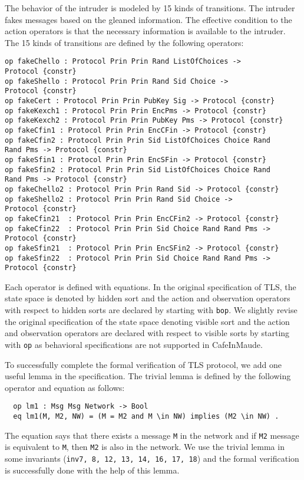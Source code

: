 \documentclass[a4paper,fleqn]{cas-dc}
\begin{document}
The behavior of the intruder is modeled by 15
kinds of transitions. The intruder fakes messages based on the gleaned information. The effective condition to the action operators is that the necessary information is available to the intruder. The 15 kinds of transitions are defined by the following operators:
\begin{small}
\begin{verbatim}
op fakeChello : Protocol Prin Prin Rand ListOfChoices ->
Protocol {constr}
op fakeShello : Protocol Prin Prin Rand Sid Choice ->
Protocol {constr}
op fakeCert : Protocol Prin Prin PubKey Sig -> Protocol {constr}
op fakeKexch1 : Protocol Prin Prin EncPms -> Protocol {constr}
op fakeKexch2 : Protocol Prin Prin PubKey Pms -> Protocol {constr}
op fakeCfin1 : Protocol Prin Prin EncCFin -> Protocol {constr}
op fakeCfin2 : Protocol Prin Prin Sid ListOfChoices Choice Rand 
Rand Pms -> Protocol {constr}
op fakeSfin1 : Protocol Prin Prin EncSFin -> Protocol {constr}
op fakeSfin2 : Protocol Prin Prin Sid ListOfChoices Choice Rand 
Rand Pms -> Protocol {constr}
op fakeChello2 : Protocol Prin Prin Rand Sid -> Protocol {constr}
op fakeShello2 : Protocol Prin Prin Rand Sid Choice ->
Protocol {constr}
op fakeCfin21  : Protocol Prin Prin EncCFin2 -> Protocol {constr}
op fakeCfin22  : Protocol Prin Prin Sid Choice Rand Rand Pms -> 
Protocol {constr}
op fakeSfin21  : Protocol Prin Prin EncSFin2 -> Protocol {constr}
op fakeSfin22  : Protocol Prin Prin Sid Choice Rand Rand Pms -> 
Protocol {constr} 
\end{verbatim}
\end{small}	
Each operator is defined with equations. In the original specification of TLS, the state space is denoted by hidden sort and the action and observation operators with respect to hidden sorts are declared by starting with \verb !bop!. 
We slightly revise the original specification of the state space denoting visible sort and the action and observation operators are declared with respect to visible sorts by starting with \verb !op! as behavioral specifications are not supported in CafeInMaude.

To successfully complete the formal verification of TLS protocol, we add one useful lemma in the specification. The trivial lemma is defined by the following operator and equation as follows:
\begin{small}
\begin{verbatim}
  op lm1 : Msg Msg Network -> Bool
  eq lm1(M, M2, NW) = (M = M2 and M \in NW) implies (M2 \in NW) .
\end{verbatim}
\end{small}	
The equation says that there exists a message \verb!M! in the network and if \verb!M2! message is equivalent to \verb!M!, then \verb!M2! is also in the network. We use the trivial lemma in some invariants (\verb!inv7, 8, 12, 13, 14, 16, 17, 18!) and the formal verification is successfully done with the help of this lemma.
\end{document}
